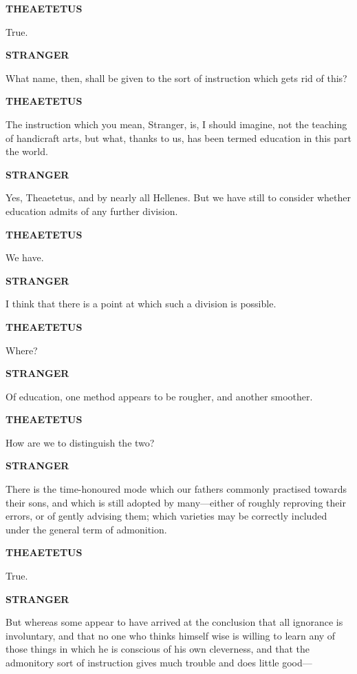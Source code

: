 \documentclass[11pt,letter]{article}
\begin{document}
\par \textbf{THEAETETUS}
\par   True.

\par \textbf{STRANGER}
\par   What name, then, shall be given to the sort of instruction which gets rid of this?

\par \textbf{THEAETETUS}
\par   The instruction which you mean, Stranger, is, I should imagine, not the teaching of handicraft arts, but what, thanks to us, has been termed education in this part the world.

\par \textbf{STRANGER}
\par   Yes, Theaetetus, and by nearly all Hellenes. But we have still to consider whether education admits of any further division.

\par \textbf{THEAETETUS}
\par   We have.

\par \textbf{STRANGER}
\par   I think that there is a point at which such a division is possible.

\par \textbf{THEAETETUS}
\par   Where?

\par \textbf{STRANGER}
\par   Of education, one method appears to be rougher, and another smoother.

\par \textbf{THEAETETUS}
\par   How are we to distinguish the two?

\par \textbf{STRANGER}
\par   There is the time-honoured mode which our fathers commonly practised towards their sons, and which is still adopted by many—either of roughly reproving their errors, or of gently advising them; which varieties may be correctly included under the general term of admonition.

\par \textbf{THEAETETUS}
\par   True.

\par \textbf{STRANGER}
\par   But whereas some appear to have arrived at the conclusion that all ignorance is involuntary, and that no one who thinks himself wise is willing to learn any of those things in which he is conscious of his own cleverness, and that the admonitory sort of instruction gives much trouble and does little good—
\end{document}
